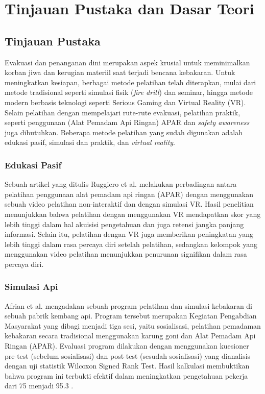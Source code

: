 \chapter{Tinjauan Pustaka dan Dasar Teori}

\section{Tinjauan Pustaka}
Evakuasi dan penanganan dini merupakan aspek krusial untuk meminimalkan korban jiwa dan kerugian materiil saat terjadi bencana kebakaran. Untuk meningkatkan kesiapan, berbagai metode pelatihan telah diterapkan, mulai dari metode tradisional seperti simulasi fisik (\textit{fire drill}) dan seminar, hingga metode modern berbasis teknologi seperti Serious Gaming dan Virtual Reality (VR).  Selain pelatihan dengan mempelajari rute-rute evakuasi, pelatihan praktik, seperti penggunaan (Alat Pemadam Api Ringan) APAR dan \textit{safety awareness} juga dibutuhkan. Beberapa metode pelatihan yang sudah digunakan adalah edukasi pasif, simulasi dan praktik, dan \textit{virtual reality}.

\subsection{Edukasi Pasif}
Sebuah artikel yang ditulis Ruggiero et al. melakukan perbadingan antara pelatihan penggunaan alat pemadam api ringan (APAR) dengan menggunakan sebuah video pelatihan non-interaktif dan dengan simulasi VR. Hasil penelitian menunjukkan bahwa pelatihan dengan menggunakan VR mendapatkan skor yang lebih tinggi dalam hal akuisisi pengetahuan dan juga retensi jangka panjang informasi. Selain itu, pelatihan dengan VR juga memberikan peningkatan yang lebih tinggi dalam rasa percaya diri setelah pelatihan, sedangkan kelompok yang menggunakan video pelatihan menunjukkan penurunan signifikan dalam rasa percaya diri\cite{lovreglio_comparing_2021}. 

\subsection{Simulasi Api}

Afrian et al. mengadakan sebuah program pelatihan dan simulasi kebakaran di sebuah pabrik kembang api. Program tersebut merupakan Kegiatan Pengabdian Masyarakat yang dibagi menjadi tiga sesi, yaitu sosialisasi, pelatihan pemadaman kebakaran secara tradisional menggunakan karung goni dan Alat Pemadam Api Ringan (APAR).  Evaluasi program dilakukan dengan menggunakan kuesioner pre-test (sebelum sosialisasi) dan post-test (sesudah sosialisasi) yang dianalisis dengan uji statistik Wilcoxon Signed Rank Test. Hasil kalkulasi membuktikan bahwa program ini terbukti efektif dalam meningkatkan pengetahuan pekerja dari 75 menjadi 95.3 \cite{purwanto2023apar}. 

